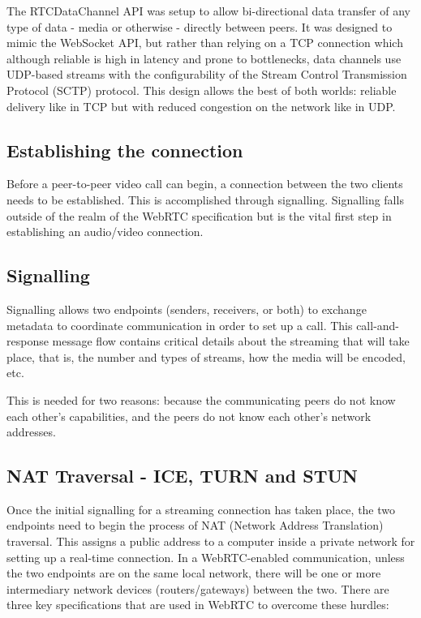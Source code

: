 The RTCDataChannel API was setup to allow bi-directional data transfer of any 
type of data - media or otherwise - directly between peers. It was designed to mimic the 
WebSocket API, but rather than relying on a TCP connection which although reliable is high 
in latency and prone to bottlenecks, data channels use UDP-based streams with the configurability 
of the Stream Control Transmission Protocol (SCTP) protocol. This design allows the best 
of both worlds: reliable delivery like in TCP but with reduced congestion on the network like in UDP.

\subsection{Establishing the connection}

Before a peer-to-peer video call can begin, a connection between the two clients 
needs to be established. This is accomplished through signalling. Signalling falls 
outside of the realm of the WebRTC specification but is the vital first step in establishing 
an audio/video connection.

\subsection{Signalling}

Signalling allows two endpoints (senders, receivers, or both) to exchange metadata to 
coordinate communication in order to set up a call. This call-and-response message flow 
contains critical details about the streaming that will take place, that is, the number 
and types of streams, how the media will be encoded, etc. 

This is needed for two reasons: because the communicating peers do not know each other’s 
capabilities, and the peers do not know each other’s network addresses.

\subsection{NAT Traversal - ICE, TURN and STUN}

Once the initial signalling for a streaming connection has taken place, the two endpoints need 
to begin the process of NAT (Network Address Translation) traversal.
This assigns a public address to a computer inside a private network for setting up a real-time connection. 
In a WebRTC-enabled communication, unless the two endpoints are on the same local network, 
there will be one or more intermediary network devices (routers/gateways) between the two. 
There are three key specifications that are used in WebRTC to overcome these hurdles:

